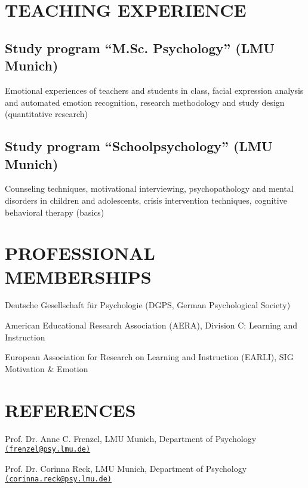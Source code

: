 \documentclass[letterpaper]{article}
\renewenvironment{itemize}{ %
  \begin{list}{}{ %
    \setlength{\leftmargin}{2.5em} %
  }
}{
  \end{list}
}
\begin{document}
\section*{TEACHING EXPERIENCE}
\subsection*{Study program “M.Sc. Psychology” (LMU Munich)}
\begin{itemize}
\item Emotional experiences of teachers and students in class, facial expression analysis and automated emotion recognition, research methodology and study design (quantitative research)
\end{itemize}

\subsection*{Study program “Schoolpsychology” (LMU Munich)}
\begin{itemize}
\item Counseling techniques, motivational interviewing, psychopathology and mental disorders in children and adolescents, crisis intervention techniques, cognitive behavioral therapy (basics)
\end{itemize}


\section*{PROFESSIONAL MEMBERSHIPS}
\begin{itemize}
\item[$\ast$] Deutsche Gesellschaft für Psychologie (DGPS, German Psychological Society)
\item[$\ast$] American Educational Research Association (AERA), Division C: Learning and Instruction
\item[$\ast$] European Association for Research on Learning and Instruction (EARLI), SIG Motivation \& Emotion
\end{itemize}


\section*{REFERENCES}
\begin{itemize}
\item[$\ast$] Prof. Dr. Anne C. Frenzel, LMU Munich, Department of Psychology \href{mailto:frenzel@psy.lmu.de}{\tt (frenzel@psy.lmu.de)} 
\item[$\ast$] Prof. Dr. Corinna Reck, LMU Munich, Department of Psychology \href{mailto:corinna.reck@psy.lmu.de}{\tt (corinna.reck@psy.lmu.de)} 
\end{itemize}
\end{document}
